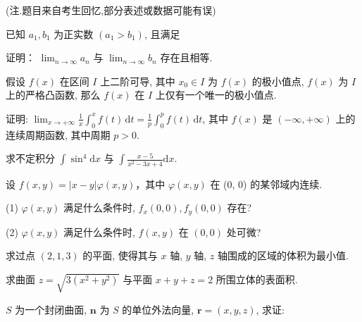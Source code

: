 (注.题目来自考生回忆,部分表述或数据可能有误)\par
\par{}
已知 $a_1, b_1$ 为正实数 $(a_1 > b_1)$, 且满足\par
\nopagebreak[4]
证明： $\lim_{n\to \infty}a_n$ 与 $\lim_{n\to \infty}b_n$ 存在且相等.\par
假设 $f(x)$ 在区间 $I$ 上二阶可导, 其中 $x_0 \in I$ 为 $f(x)$ 的极小值点, $f(x)$ 为 $I$ 上的严格凸函数, 那么 $f(x)$ 在 $I$ 上仅有一个唯一的极小值点.\par
证明: $\lim_{x \to +\infty} \frac{1}{x} \int_{0}^{x} f(t) \, \mathrm{d}t = \frac{1}{p} \int_{0}^{p} f(t) \, \mathrm{d}t$, 其中 $f(x)$ 是 $(- \infty, + \infty)$ 上的连续周期函数, 其中周期 $p > 0$.\par
求不定积分 $\int \sin^4 \mathrm{d}x$ 与 $\int \frac{x - 5}{x^2 - 3x + 4} \mathrm{d}x$.\par
设 $f(x, y) = |x - y| \varphi(x, y)$，其中 $\varphi(x, y)$ 在 (0, 0) 的某邻域内连续.\par
(1) $\varphi(x, y)$ 满足什么条件时, $f_x(0, 0), f_y(0, 0)$ 存在?\par
(2) $\varphi(x, y)$ 满足什么条件时, $f(x, y)$ 在 $(0, 0)$ 处可微?\par
求过点 $(2,1,3)$ 的平面, 使得其与 $x$ 轴, $y$ 轴, $z$ 轴围成的区域的体积为最小值.\par
求曲面 $z = \sqrt{3(x^2 + y^2)}$ 与平面 $x + y + z = 2$ 所围立体的表面积.\par
$S$ 为一个封闭曲面, $\pmb{n}$ 为 $S$ 的单位外法向量, $\pmb{r} = (x,y,z)$, 求证:\par

